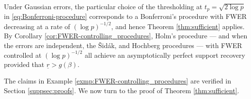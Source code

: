 \begin{example} \label{exmp:FWER-controlling_procedures}
Under Gaussian errors, the particular choice of the thresholding at $t_p = \sqrt{2\log{p}}$ in \eqref{eq:Bonferroni-procedure} corresponds to a Bonferroni's procedure with FWER decreasing at a rate of $(\log{p})^{-1/2}$, and hence Theorem \ref{thm:sufficient} applies. 
By Corollary \ref{cor:FWER-controlling_procedures}, Holm's procedure --- and when the errors are independent, the {\v{S}}id{\'a}k, and Hochberg procedures --- with FWER controlled at $(\log{p})^{-1/2}$ all achieve an asymptotically 
perfect support recovery provided that $\underline{r}>g(\beta)$.
\end{example}

The claims in Example \ref{exmp:FWER-controlling_procedures} are verified in Section \ref{suppsec:proofs}.
We now turn to the proof of Theorem \ref{thm:sufficient}.

